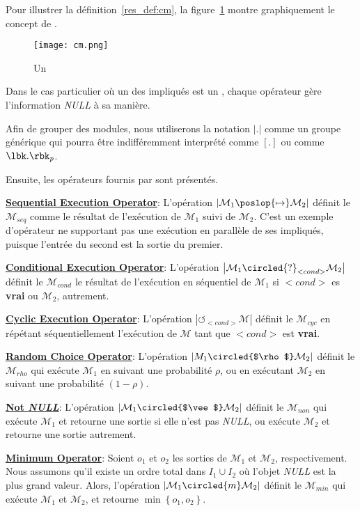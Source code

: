 Pour illustrer la définition~\ref{res_def:cm}, la figure~\ref{res_fig:cm} montre graphiquement le concept de \cm.
\begin{figure}
	\centering
	\texttt{[image: cm.png]} %
	\caption[]{Un \cm}
	\label{res_fig:cm}
\end{figure}%

Dans le  cas particulier  où un  des \cms{}  impliqués est  un \opch{}, chaque opérateur gère l'information {\it NULL} à sa manière.

Afin   de  grouper   des   modules,  nous   utiliserons  la   notation $\left|.\right|$ comme un groupe générique qui pourra être indifféremment interprété comme $[.]$ ou comme $\lbk . \rbk_p$.

Ensuite, les opérateurs fournis par \posl{} sont présentés. 

\underline{\bf Sequential Execution Operator}: L'opération $\left|\mathcal{M}_1\poslop{\mapsto}\mathcal{M}_2\right|$ définit le \cm{} $\mathcal{M}_{seq}$ comme le résultat de l'exécution de $\mathcal{M}_1$ suivi de $\mathcal{M}_2$. C'est un exemple d'opérateur ne  supportant pas une exécution en parallèle de ses \cms{} impliqués, puisque l'entrée du second \cm{} est la sortie du premier.

\underline{\bf Conditional Execution Operator}: L'opération $\left|\mathcal{M}_1\circled{?}_{<cond>}\mathcal{M}_2\right|$ définit le \cm{} $\mathcal{M}_{cond}$ le résultat de l'exécution en séquentiel de $\mathcal{M}_1$ si $<cond>$ es {\bf vrai} ou $\mathcal{M}_2$, autrement.

\underline{\bf Cyclic Execution Operator}: L'opération $\left|\circlearrowleft_{<cond>}\mathcal{M}\right|$ définit le \cm{} $\mathcal{M}_{cyc}$ en répétant séquentiellement l'exécution de $\mathcal{M}$ tant que $<cond>$ est {\bf vrai}.

\underline{\bf Random Choice Operator}: L'opération $\left|M_1\circled{$\rho$}\mathcal{M}_2\right|$ définit le \cm{} $\mathcal{M}_{rho}$ qui exécute $\mathcal{M}_1$ en suivant une probabilité $\rho$, ou en exécutant $\mathcal{M}_2$ en suivant une probabilité $(1-\rho)$.

\underline{\bf Not {\it NULL}}: L'opération $\left|\mathcal{M}_1\circled{$\vee$}\mathcal{M}_2\right|$ définit le \cm{} $\mathcal{M}_{non}$ qui exécute $\mathcal{M}_1$ et retourne une sortie si elle n'est pas {\it NULL}, ou exécute $\mathcal{M}_2$ et retourne une sortie autrement.

\underline{\bf Minimum Operator}: Soient $o_1$ et $o_2$ les sorties de $\mathcal{M}_1$ et $\mathcal{M}_2$, respectivement. Nous assumons qu'il existe un ordre total dans $I_1 \cup I_2$ où l'objet \emph{NULL} est la plus grand valeur. Alors, l'opération $\left|\mathcal{M}_1\circled{m}\mathcal{M}_2\right|$ définit le \cm{} $\mathcal{M}_{min}$ qui exécute $\mathcal{M}_1$ et $\mathcal{M}_2$, et retourne $\min\left\{o_1,o_2\right\}$.

